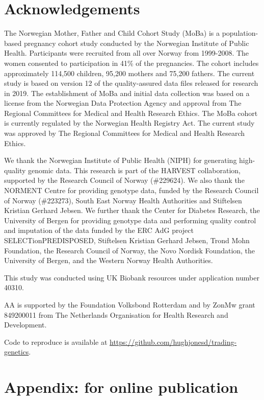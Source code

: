 \documentclass[
  12pt,
]{article}
\theoremstyle{definition}
\theoremstyle{definition}
\theoremstyle{definition}
\theoremstyle{definition}
\theoremstyle{remark}
\begin{document}
\hypertarget{acknowledgements}{%
\section{Acknowledgements}\label{acknowledgements}}

The Norwegian Mother, Father and Child
Cohort Study (MoBa) is a population-based pregnancy cohort study conducted by
the Norwegian Institute of Public Health. Participants were recruited from all
over Norway from 1999-2008. The women consented to participation in 41\% of the
pregnancies. The cohort includes approximately 114,500 children, 95,200 mothers
and 75,200 fathers. The current study is based on version
12 of the quality-assured data files released for research in 2019. The
establishment of MoBa and initial data collection was based on a license from
the Norwegian Data Protection Agency and approval from The Regional Committees
for Medical and Health Research Ethics. The MoBa cohort is currently regulated
by the Norwegian Health Registry Act. The current study was approved by The
Regional Committees for Medical and Health Research Ethics.

We thank the Norwegian Institute of Public Health (NIPH) for generating high-quality
genomic data. This research is part of the HARVEST collaboration, supported by the
Research Council of Norway (\#229624). We also thank the NORMENT Centre for providing
genotype data, funded by the Research Council of Norway (\#223273), South East Norway
Health Authorities and Stiftelsen Kristian Gerhard Jebsen. We further thank the Center for
Diabetes Research, the University of Bergen for providing genotype data and performing
quality control and imputation of the data funded by the ERC AdG project
SELECTionPREDISPOSED, Stiftelsen Kristian Gerhard Jebsen, Trond Mohn Foundation,
the Research Council of Norway, the Novo Nordisk Foundation, the University of Bergen,
and the Western Norway Health Authorities.

This study was conducted using UK Biobank resources under application number
40310.

AA is supported by the Foundation Volksbond Rotterdam and by ZonMw grant
849200011 from The Netherlands Organisation for Health Research and Development.

Code to reproduce is available at \url{https://github.com/hughjonesd/trading-genetics}.

\FloatBarrier

\newpage

\hypertarget{appendix-for-online-publication}{%
\section{Appendix: for online publication}\label{appendix-for-online-publication}}
\end{document}
